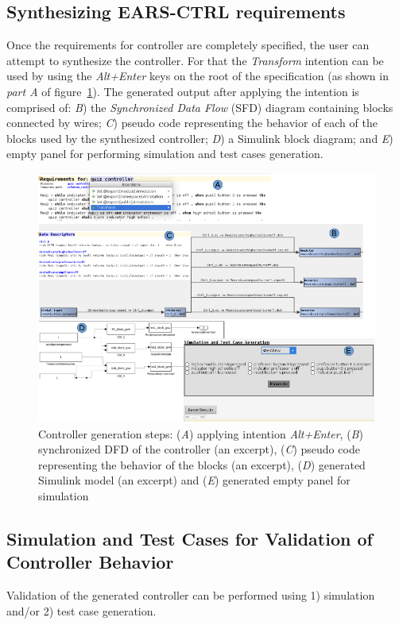 \subsection{Synthesizing \textsf{EARS-CTRL} requirements}
\label{SynthReq}
\vspace{-.3cm}
Once the requirements for controller are completely specified, the user can
attempt to synthesize the controller. For that the \emph{Transform} intention
can be used by using the \emph{Alt+Enter} keys on the root of the specification
(as shown in \emph{part A} of figure~\ref{fig:Spec_transform}). The generated
output after applying the intention is comprised of: \emph{B}) the 
\emph{Synchronized Data Flow} (SFD) diagram containing blocks connected by
wires; \emph{C}) pseudo code representing the behavior of each of the blocks
used by the synthesized controller; \emph{D}) a Simulink block
diagram; and \emph{E}) empty panel
for performing simulation and test cases generation.
\begin{figure}[!h]
\centering
\includegraphics[width=1\textwidth]{./images/Transform.png}
\caption{Controller generation steps: (\emph{A}) applying intention \emph{Alt+Enter},
(\emph{B}) synchronized DFD of the controller (an excerpt), (\emph{C}) pseudo
code representing the behavior of the blocks (an excerpt), (\emph{D})
generated Simulink model (an excerpt) and (\emph{E})
generated empty panel for simulation}
\label{fig:Spec_transform}
\end{figure}
\vspace{-.5cm}
\subsection{Simulation and Test Cases for Validation of Controller
Behavior}
\vspace{-.2cm}
Validation of the generated controller can be performed using 1) simulation
and/or 2) test case generation.
\vspace{-.3cm}

